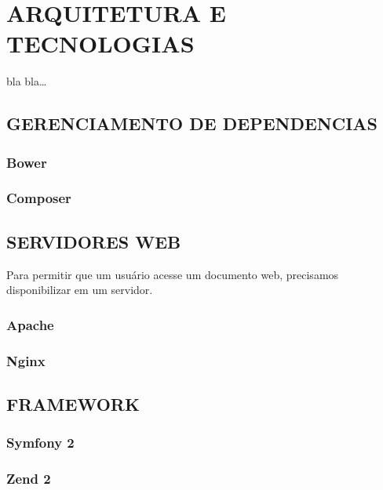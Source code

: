 \chapter{ARQUITETURA E TECNOLOGIAS}
\label{tecnologias}
 
bla bla\ldots








\section{GERENCIAMENTO DE DEPENDENCIAS}
\subsection{Bower}
\subsection{Composer}

\section{SERVIDORES WEB}
Para permitir que um usuário acesse um documento web, precisamos disponibilizar
em um servidor. %

\subsection{Apache}
\subsection{Nginx}

\section{FRAMEWORK}
\subsection{Symfony 2}
\subsection{Zend 2}

